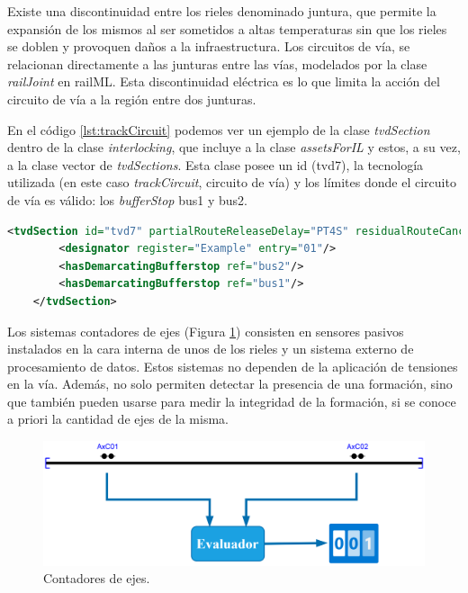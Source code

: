     Existe una discontinuidad entre los rieles denominado juntura, que permite la expansión de los mismos al ser sometidos a altas temperaturas sin que los rieles se doblen y provoquen daños a la infraestructura. Los circuitos de vía, se relacionan directamente a las junturas entre las vías, modelados por la clase \textit{railJoint} en railML.  Esta discontinuidad eléctrica es lo que limita la acción del circuito de vía a la región entre dos junturas.

    En el código \ref{lst:trackCircuit} podemos ver un ejemplo de la clase \textit{tvdSection} dentro de la clase \textit{interlocking}, que incluye a la clase \textit{assetsForIL} y estos, a su vez, a la clase vector de \textit{tvdSections}. Esta clase posee un id (tvd7), la tecnología utilizada (en este caso \textit{trackCircuit}, circuito de vía) y los límites donde el circuito de vía es válido: los \textit{bufferStop} bus1 y bus2.

    \begin{lstlisting}[language = XML, caption = Clase \textit{TrackCircuit} , label = {lst:trackCircuit}]
    <tvdSection id="tvd7" partialRouteReleaseDelay="PT4S" residualRouteCancellationDelay="PT90S" technology="trackCircuit" isBerthingTrack="false">
        <designator register="Example" entry="01"/>
        <hasDemarcatingBufferstop ref="bus2"/>
        <hasDemarcatingBufferstop ref="bus1"/>
    </tvdSection>
    \end{lstlisting}

    Los sistemas contadores de ejes (Figura \ref{fig:deteccion_2}) consisten en sensores pasivos instalados en la cara interna de unos de los rieles y un sistema externo de procesamiento de datos. Estos sistemas no dependen de la aplicación de tensiones en la vía. Además, no solo permiten detectar la presencia de una formación, sino que también pueden usarse para medir la integridad de la formación, si se conoce a priori la cantidad de ejes de la misma. 

    \begin{figure}[H]
        \centering
        \includegraphics[width=1\textwidth]{Figuras/contador}
        \centering\caption{Contadores de ejes.}
        \label{fig:deteccion_2}
    \end{figure}

